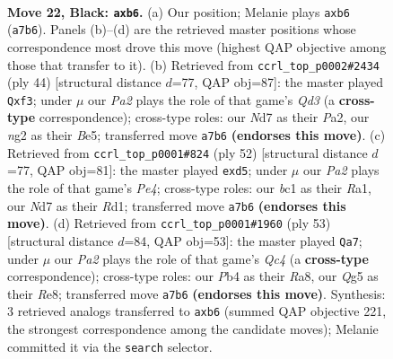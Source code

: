 \documentclass[11pt]{article}
\begin{document}
\clearpage

\begin{figure}[p]\centering
\begin{subfigure}{0.46\textwidth}\centering
\resizebox{\linewidth}{!}{%
\newchessgame
\chessboard[
  setfen={r6r/p2nk2p/1Npbp1p1/6q1/1p1P4/P3P2P/1P4N1/R1BQ1RK1 b - - 1 22},
  showmover=false,
  pgfstyle=straightmove, color=movearrow, markmove={a7-b6}
]}
\caption{}
\end{subfigure}\hfill
\begin{subfigure}{0.46\textwidth}\centering
\resizebox{\linewidth}{!}{%
\newchessgame
\chessboard[
  setfen={r2qr1k1/p4pb1/1p4pp/3pB3/3P4/1P1Q1n1P/P4PP1/2R1RK2 w - - 0 23},
  showmover=false,
  pgfstyle=straightmove, color=movearrow, markmove={d3-f3}
]}
\caption{}
\end{subfigure}
\\[4pt]
\begin{subfigure}{0.46\textwidth}\centering
\resizebox{\linewidth}{!}{%
\newchessgame
\chessboard[
  setfen={1r1r2k1/5ppp/p4b2/q1pnp3/P3P1Q1/2P1B3/5PPP/R2R2K1 w - - 0 27},
  showmover=false,
  pgfstyle=straightmove, color=movearrow, markmove={e4-d5}
]}
\caption{}
\end{subfigure}\hfill
\begin{subfigure}{0.46\textwidth}\centering
\resizebox{\linewidth}{!}{%
\newchessgame
\chessboard[
  setfen={r3r1k1/4bpp1/2pp1P2/2q3Pp/3N2bP/1PPB4/3Q4/1K2RR2 b - - 0 27},
  showmover=false,
  pgfstyle=straightmove, color=movearrow, markmove={c5-a7}
]}
\caption{}
\end{subfigure}
\caption{\textbf{Move 22, Black: \texttt{axb6}.} (a) Our position; Melanie plays \texttt{axb6} (\texttt{a7b6}). Panels (b)--(d) are the retrieved master positions whose correspondence most drove this move (highest QAP objective among those that transfer to it). (b) Retrieved from \texttt{ccrl\_top\_p0002\#2434} (ply 44) [structural distance $d$=77, QAP obj=87]: the master played \texttt{Qxf3}; under $\mu$ our \emph{Pa2} plays the role of that game's \emph{Qd3} (a \textbf{cross-type} correspondence); cross-type roles: our \emph{N}d7 as their \emph{P}a2, our \emph{n}g2 as their \emph{B}e5; transferred move \texttt{a7b6} \textbf{(endorses this move)}. (c) Retrieved from \texttt{ccrl\_top\_p0001\#824} (ply 52) [structural distance $d$=77, QAP obj=81]: the master played \texttt{exd5}; under $\mu$ our \emph{Pa2} plays the role of that game's \emph{Pe4}; cross-type roles: our \emph{b}c1 as their \emph{R}a1, our \emph{N}d7 as their \emph{R}d1; transferred move \texttt{a7b6} \textbf{(endorses this move)}. (d) Retrieved from \texttt{ccrl\_top\_p0001\#1960} (ply 53) [structural distance $d$=84, QAP obj=53]: the master played \texttt{Qa7}; under $\mu$ our \emph{Pa2} plays the role of that game's \emph{Qc4} (a \textbf{cross-type} correspondence); cross-type roles: our \emph{P}b4 as their \emph{R}a8, our \emph{Q}g5 as their \emph{R}e8; transferred move \texttt{a7b6} \textbf{(endorses this move)}. Synthesis: 3 retrieved analogs transferred to \texttt{axb6} (summed QAP objective 221, the strongest correspondence among the candidate moves); Melanie committed it via the \texttt{search} selector.}
\label{fig:thought-m43}
\end{figure}
\end{document}
